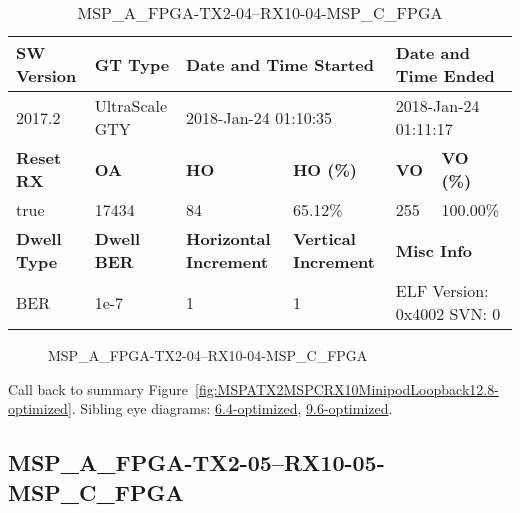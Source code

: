 \begin{table}[h]
\centering
\caption{MSP\_A\_FPGA-TX2-04--RX10-04-MSP\_C\_FPGA}
\label{tab:MSPAFPGATX204RX1004MSPCFPGA12.8-optimized}
\begin{tabular}{@{}|l|l|l|l|l|l|@{}}
\toprule
\textbf{SW Version}                & \textbf{GT Type}   & \multicolumn{2}{l|}{\textbf{Date and Time Started}}            & \multicolumn{2}{l|}{\textbf{Date and Time Ended}}        \\ \midrule
2017.2                       & UltraScale GTY          & \multicolumn{2}{l|}{2018-Jan-24 01:10:35}                   & \multicolumn{2}{l|}{2018-Jan-24 01:11:17}               \\ \midrule
\textbf{Reset RX}                  & \textbf{OA} & \textbf{HO}   & \textbf{HO (\%)} & \textbf{VO} & \textbf{VO (\%)} \\ \midrule
true & 17434        & 84          & 65.12\%        & 255        & 100.00\%       \\ \midrule
\textbf{Dwell Type}                & \textbf{Dwell BER} & \textbf{Horizontal Increment} & \textbf{Vertical Increment}    & \multicolumn{2}{l|}{\textbf{Misc Info}}                  \\ \midrule
BER                            & 1e-7        & 1        & 1           & \multicolumn{2}{l|}{ELF Version: 0x4002 SVN: 0}                         \\ \bottomrule
\end{tabular}
\end{table}

\begin{figure}[h]
\caption{MSP\_A\_FPGA-TX2-04--RX10-04-MSP\_C\_FPGA} \label{fig:MSPAFPGATX204RX1004MSPCFPGA12.8-optimized}
\end{figure}

Call back to summary Figure~\ref{fig:MSPATX2MSPCRX10MinipodLoopback12.8-optimized}.
Sibling eye diagrams: \hyperref[sec:MSPAFPGATX204RX1004MSPCFPGA6.4-optimized]{6.4-optimized}, \hyperref[sec:MSPAFPGATX204RX1004MSPCFPGA9.6-optimized]{9.6-optimized}.

\clearpage
\newpage


\subsection{MSP\_A\_FPGA-TX2-05--RX10-05-MSP\_C\_FPGA}\label{sec:MSPAFPGATX205RX1005MSPCFPGA12.8-optimized}

